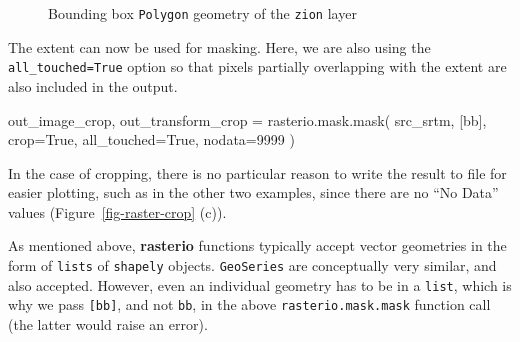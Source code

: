 \documentclass[
  letterpaper,
]{krantz}
\newenvironment{Shaded}{\begin{snugshade}}{\end{snugshade}}
\newcommand{\DecValTok}[1]{\textcolor[rgb]{0.68,0.00,0.00}{#1}}
\newcommand{\NormalTok}[1]{\textcolor[rgb]{0.00,0.23,0.31}{#1}}
\newcommand{\OperatorTok}[1]{\textcolor[rgb]{0.37,0.37,0.37}{#1}}
\newcommand{\VariableTok}[1]{\textcolor[rgb]{0.07,0.07,0.07}{#1}}
\begin{document}
\begin{figure}[H]


\caption{\label{fig-zion-bbox}Bounding box
\texttt{\textquotesingle{}Polygon\textquotesingle{}} geometry of the
\texttt{zion} layer}

\end{figure}%

The extent can now be used for masking. Here, we are also using the
\texttt{all\_touched=True} option so that pixels partially overlapping
with the extent are also included in the output.

\begin{Shaded}
\begin{Highlighting}[]
\NormalTok{out\_image\_crop, out\_transform\_crop }\OperatorTok{=}\NormalTok{ rasterio.mask.mask(}
\NormalTok{    src\_srtm, }
\NormalTok{    [bb], }
\NormalTok{    crop}\OperatorTok{=}\VariableTok{True}\NormalTok{, }
\NormalTok{    all\_touched}\OperatorTok{=}\VariableTok{True}\NormalTok{, }
\NormalTok{    nodata}\OperatorTok{=}\DecValTok{9999}
\NormalTok{)}
\end{Highlighting}
\end{Shaded}

In the case of cropping, there is no particular reason to write the
result to file for easier plotting, such as in the other two examples,
since there are no ``No Data'' values (Figure~\ref{fig-raster-crop}
(c)).

\begin{tcolorbox}[enhanced jigsaw, title=\textcolor{quarto-callout-note-color}{\faInfo}\hspace{0.5em}{Note}, coltitle=black, colbacktitle=quarto-callout-note-color!10!white, breakable, titlerule=0mm, colframe=quarto-callout-note-color-frame, opacitybacktitle=0.6, colback=white, bottomrule=.15mm, left=2mm, leftrule=.75mm, toprule=.15mm, toptitle=1mm, bottomtitle=1mm, arc=.35mm, opacityback=0, rightrule=.15mm]

As mentioned above, \textbf{rasterio} functions typically accept vector
geometries in the form of \texttt{lists} of \texttt{shapely} objects.
\texttt{GeoSeries} are conceptually very similar, and also accepted.
However, even an individual geometry has to be in a \texttt{list}, which
is why we pass \texttt{{[}bb{]}}, and not \texttt{bb}, in the above
\texttt{rasterio.mask.mask} function call (the latter would raise an
error).

\end{tcolorbox}
\end{document}
